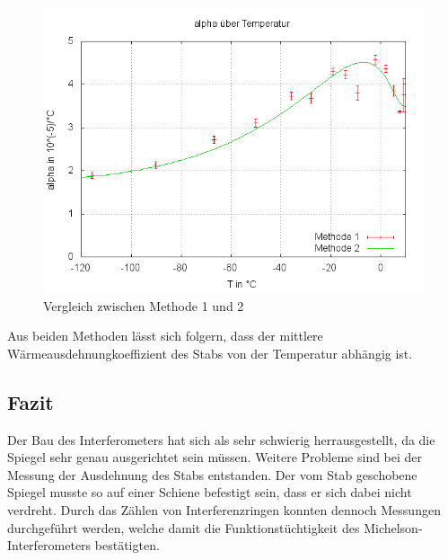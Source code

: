 \begin{figure}
\centering
        \includegraphics[width=.8\textwidth]{images/alpha(T)mitFit.png}
\caption{Vergleich zwischen Methode 1 und 2}
\label{plot:alpha(T)mitFit}
\end{figure}


Aus beiden Methoden lässt sich folgern, dass der mittlere Wärmeausdehnungkoeffizient des Stabs von der Temperatur abhängig ist.

\subsection{Fazit}


Der Bau des Interferometers hat sich als sehr schwierig herrausgestellt, da die Spiegel sehr genau ausgerichtet sein müssen.
Weitere Probleme sind bei der Messung der Ausdehnung des Stabs entstanden. Der vom Stab geschobene Spiegel musste so auf einer Schiene befestigt sein, dass er sich dabei nicht verdreht.
Durch das Zählen von Interferenzringen konnten dennoch Messungen durchgeführt werden, welche damit die Funktionstüchtigkeit des Michelson-Interferometers bestätigten.


